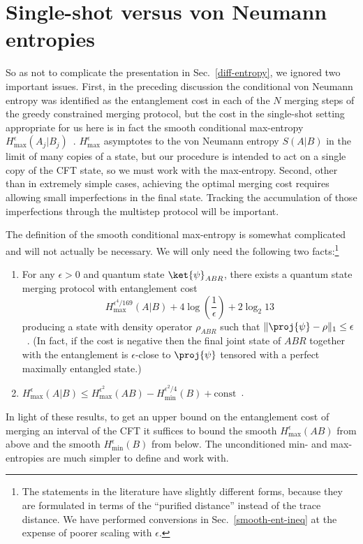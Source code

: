 \documentclass[12pt]{article}
\newcommand{\Hmax}{H_{\max}}
\newcommand{\Hmin}{H_{\min}}
\newcommand{\secref}[1]{Sec.~\ref{#1}}
\begin{document}
\section{Single-shot versus von Neumann entropies} \label{sec:single-shot}

So as not to complicate the presentation in Sec.~\ref{diff-entropy}, we ignored two important issues. First, in the preceding discussion the conditional von Neumann entropy was identified as the entanglement cost in each of the $N$ merging steps of the greedy constrained merging protocol, but the cost in the single-shot setting appropriate for us here is in fact the smooth conditional max-entropy $\Hmax^\epsilon(A_j|B_j)$~\cite{oneshot}. $\Hmax^\epsilon$ asymptotes to the von Neumann entropy $S(A|B)$ in the limit of many copies of a state, but our procedure is intended to act on a single copy of the CFT state, so we must work with the max-entropy. Second, other than in extremely simple cases, achieving the optimal merging cost requires allowing small imperfections in the final state. Tracking the accumulation of those imperfections through the multistep protocol will be important.

The definition of the smooth conditional max-entropy is somewhat complicated~\cite{oneshot,chain} and will not actually be necessary. We will only need the following two facts:\footnote{The statements in the literature have slightly different forms, because they are formulated in terms of the ``purified distance'' instead of the trace distance. We have performed conversions in \secref{smooth-ent-ineq} at the expense of poorer scaling with $\epsilon$.}
\begin{enumerate}
\item For any $\epsilon > 0$ and quantum state $\ket{\psi}_{ABR}$, there exists a quantum state merging protocol with entanglement cost
\begin{equation} \label{ub-single-shot}
\Hmax^{\epsilon^4/169}(A|B) + 4 \log\left(\frac{1}{\epsilon}\right) + 2 \log_2 13
\end{equation}
producing a state with density operator $\rho_{ABR}$ such that $\| \proj{\psi} - \rho \|_1 \leq \epsilon$~\cite{oneshot}. (In fact, if the cost is negative then the final joint state of $ABR$ together with the entanglement is $\epsilon$-close to $\proj{\psi}$ tensored with a perfect maximally entangled state.)
\item $\Hmax^\epsilon(A|B) \leq \Hmax^{\epsilon^2}(AB) - \Hmin^{\epsilon^2/4}(B) + \text{const}$~\cite{chain}.
\end{enumerate}
In light of these results, to get an upper bound on the entanglement cost of merging an interval of the CFT it suffices to bound the smooth $\Hmax^\epsilon(AB)$ from above and the smooth $\Hmin^\epsilon(B)$ from below. The unconditioned min- and max- entropies are much simpler to define and work with.
\end{document}
